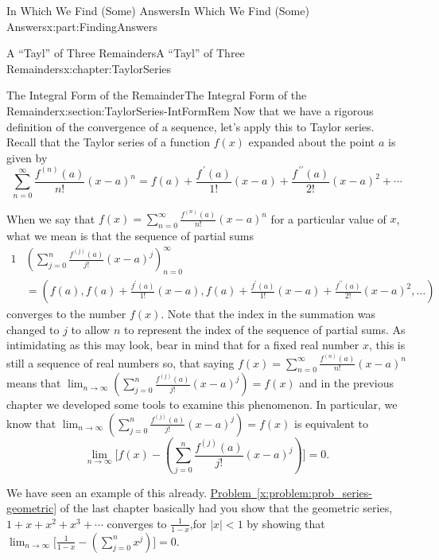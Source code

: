 \documentclass[oneside,10pt,]{book}
\newcommand{\xreffont}{\relax}
\numberwithin{equation}{section}
\def\limit#1#2#3{{\displaystyle\lim_{#1\rightarrow #2}#3}}
\newcommand{\lt}{<}
\newcommand{\amp}{&}
\begin{document}
\begin{partptx}{In Which We Find (Some) Answers}{}{In Which We Find (Some) Answers}{}{}{x:part:FindingAnswers}
\typeout{************************************************}
%
\begin{chapterptx}{A ``Tayl'' of Three Remainders}{}{A ``Tayl'' of Three Remainders}{}{}{x:chapter:TaylorSeries}
%
%
\typeout{************************************************}
\typeout{************************************************}
%
\begin{sectionptx}{The Integral Form of the Remainder}{}{The Integral Form of the Remainder}{}{}{x:section:TaylorSeries-IntFormRem}
Now that we have a rigorous definition of the convergence of a sequence, let's apply this to Taylor series.  Recall that the Taylor series of a function \(f(x)\) expanded about the point \(a\) is given by%
\begin{equation*}
\sum_{n=0}^\infty\frac{f^{(n)}(a)}{n!}(x-a)^n=f(a)+\frac{f^{\,\prime}(a)}{1!}(x-a)+\frac{f^{\,\prime\prime}(a)}{2!}(x-a)^2+\cdots
\end{equation*}
%
\par
When we say that \(f(x)=\sum_{n=0}^\infty\frac{f^{(n)}(a)}{n!}(x-a)^n\) for a particular value of \(x\), what we mean is that the sequence of partial sums%
\begin{alignat*}{1}
\amp\left(\sum_{j=0}^n\frac{f^{(j)}(a)}{j!}(x-a)^j\right)_{n=0}^\infty\\
\amp= \left(f(a), f(a)+\frac{f^{\prime}(a)}{1!}(x-a),f(a)
+\frac{f^{\prime}(a)}{1!}(x-a)+\frac{f^{\prime\prime}(a)}{2!}(x-a)^2,\ldots\right)
\end{alignat*}
converges to the number \(f(x)\). Note that the index in the summation was changed to \(j\) to allow \(n\) to represent the index of the sequence of partial sums. As intimidating as this may look, bear in mind that for a fixed real number \(x\), this is still a sequence of real numbers so, that saying \(f(x)=\sum_{n=0}^\infty\frac{f^{(n)}(a)}{n!}(x-a)^n\) means that \(\lim_{n\rightarrow\infty}\left(\sum_{j=0}^n\frac{f^{(j)}(a)}{j!}(x-a)^j\right)=f(x)\) and in the previous chapter we developed some tools to examine this phenomenon. In particular, we know that \(\lim_{n\rightarrow\infty}\left(\sum_{j=0}^n\frac{f^{(j)}(a)}{j!}(x-a)^j\right)=f(x)\) is equivalent to%
\begin{equation*}
\lim_{n\rightarrow\infty}\Biggl[f(x)-\left(\sum_{j=0}^n \frac{f^{(j)}(a)}{j!}(x-a)^j\right)\Biggr]=0\text{.}
\end{equation*}
%
\par
We have seen an example of this already. \hyperref[x:problem:prob_series-geometric]{Problem~{\xreffont\ref{x:problem:prob_series-geometric}}} of the last chapter basically had you show that  the geometric series, \(1+x+x^2+x^3+\cdots\) converges to \(\frac{1}{1-x}\),for \(|x|\lt 1\) by showing that \(\limit{n}{\infty}{\Biggl[\frac{1}{1-x}-\left(\sum_{j=0}^nx^j\right)\Biggr]=0}\).%

\end{sectionptx}
\end{chapterptx}
\end{partptx}
\end{document}
